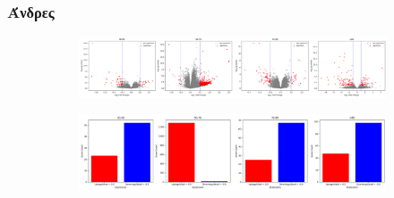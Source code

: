 \documentclass[12pt]{report}
\begin{document}
            \subsubsection*{Άνδρες}
                \vspace{-0.5cm}
                \begin{figure}[H]
                    \centering
                    \begin{subfigure}[b]{1\textwidth}
                        \centering
                        \includegraphics[width=1\textwidth]{Chapter-3/volcano_plot_consoVisits_Male.png}
                        \label{fig:app_deg_volcano_males}
                    \end{subfigure}
                    \vspace{0.5cm}
                    \begin{subfigure}[b]{1\textwidth}
                        \centering
                        \includegraphics[width=1\textwidth]{Chapter-3/barplot_plot_consoVisits_Male.png}
                        \label{fig:app_deg_bars_males}
                    \end{subfigure}
                \end{figure}
\end{document}
